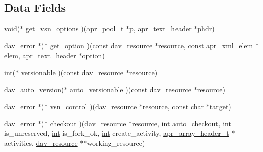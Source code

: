 \subsection*{Data Fields}
\begin{DoxyCompactItemize}
\item 
\hyperlink{group__MOD__ISAPI_gacd6cdbf73df3d9eed42fa493d9b621a6}{void}($\ast$ \hyperlink{structdav__hooks__vsn_aeb9e10749c39e06b6c400b4e0b3704ed}{get\+\_\+vsn\+\_\+options} )(\hyperlink{structapr__pool__t}{apr\+\_\+pool\+\_\+t} $\ast$\hyperlink{group__APACHE__CORE__MPM_ga5cd91701e5c167f2b1a38e70ab57817e}{p}, \hyperlink{structapr__text__header}{apr\+\_\+text\+\_\+header} $\ast$\hyperlink{group__MOD__DAV_ga08f35dafe4ef680fc79b6e69d71c8f90}{phdr})
\item 
\hyperlink{structdav__error}{dav\+\_\+error} $\ast$($\ast$ \hyperlink{structdav__hooks__vsn_a80ef5fc6d0acb42ae2c216d70df70baf}{get\+\_\+option} )(const \hyperlink{structdav__resource}{dav\+\_\+resource} $\ast$\hyperlink{group__APR__Util__RL_gaa6244aacafcc4ec1d0727bdb32614b11}{resource}, const \hyperlink{structapr__xml__elem}{apr\+\_\+xml\+\_\+elem} $\ast$\hyperlink{structelem}{elem}, \hyperlink{structapr__text__header}{apr\+\_\+text\+\_\+header} $\ast$\hyperlink{pcretest_8txt_a737bdf2e23a8aca3ce89e79e9df35b3e}{option})
\item 
\hyperlink{pcre_8txt_a42dfa4ff673c82d8efe7144098fbc198}{int}($\ast$ \hyperlink{structdav__hooks__vsn_a0f752befdafe1d2edba5de6abbbb457c}{versionable} )(const \hyperlink{structdav__resource}{dav\+\_\+resource} $\ast$\hyperlink{group__APR__Util__RL_gaa6244aacafcc4ec1d0727bdb32614b11}{resource})
\item 
\hyperlink{group__MOD__DAV_ga3e7f63f564d3cdf36d400e92e309397d}{dav\+\_\+auto\+\_\+version}($\ast$ \hyperlink{structdav__hooks__vsn_a2eb0ca15810b65ed33f6113f32073656}{auto\+\_\+versionable} )(const \hyperlink{structdav__resource}{dav\+\_\+resource} $\ast$\hyperlink{group__APR__Util__RL_gaa6244aacafcc4ec1d0727bdb32614b11}{resource})
\item 
\hyperlink{structdav__error}{dav\+\_\+error} $\ast$($\ast$ \hyperlink{structdav__hooks__vsn_abe6804c531679fc0c36e4b27fc7f8632}{vsn\+\_\+control} )(\hyperlink{structdav__resource}{dav\+\_\+resource} $\ast$\hyperlink{group__APR__Util__RL_gaa6244aacafcc4ec1d0727bdb32614b11}{resource}, const char $\ast$target)
\item 
\hyperlink{structdav__error}{dav\+\_\+error} $\ast$($\ast$ \hyperlink{structdav__hooks__vsn_aa9d97694d7d1efe8275d6749e95708c4}{checkout} )(\hyperlink{structdav__resource}{dav\+\_\+resource} $\ast$\hyperlink{group__APR__Util__RL_gaa6244aacafcc4ec1d0727bdb32614b11}{resource}, \hyperlink{pcre_8txt_a42dfa4ff673c82d8efe7144098fbc198}{int} auto\+\_\+checkout, \hyperlink{pcre_8txt_a42dfa4ff673c82d8efe7144098fbc198}{int} is\+\_\+unreserved, \hyperlink{pcre_8txt_a42dfa4ff673c82d8efe7144098fbc198}{int} is\+\_\+fork\+\_\+ok, \hyperlink{pcre_8txt_a42dfa4ff673c82d8efe7144098fbc198}{int} create\+\_\+activity, \hyperlink{structapr__array__header__t}{apr\+\_\+array\+\_\+header\+\_\+t} $\ast$activities, \hyperlink{structdav__resource}{dav\+\_\+resource} $\ast$$\ast$working\+\_\+resource)
$$
\end{DoxyCompactItemize}
